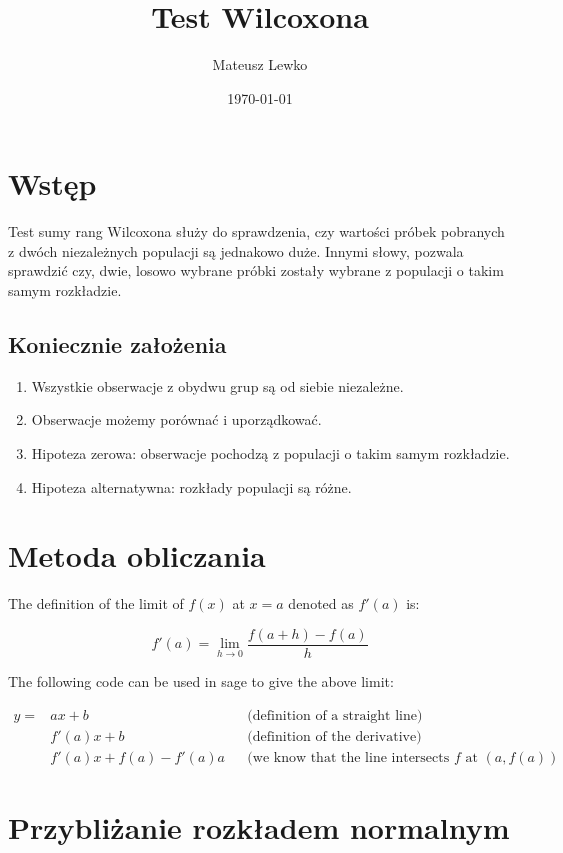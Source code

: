 \documentclass[a4paper]{article}
\title{Test Wilcoxona}
\author{Mateusz Lewko}
\date{\today}
\begin{document}
\maketitle

\section{Wstęp}

 Test sumy rang Wilcoxona służy do sprawdzenia, czy wartości próbek pobranych z dwóch niezależnych populacji są jednakowo duże. Innymi słowy, pozwala sprawdzić czy, dwie, losowo wybrane próbki zostały wybrane z populacji o takim samym rozkładzie. 

\subsection{Koniecznie założenia}
\begin{enumerate}
    \item Wszystkie obserwacje z obydwu grup są od siebie niezależne.
    \item Obserwacje możemy porównać i uporządkować.
    \item Hipoteza zerowa: obserwacje pochodzą z populacji o takim samym rozkładzie.
    \item Hipoteza alternatywna: rozkłady populacji są różne.
\end{enumerate}

\section{Metoda obliczania}

The definition of the limit of $f(x)$ at $x=a$ denoted as $f'(a)$ is:

\begin{equation}
f'(a) = \lim_{h\to0}\frac{f(a+h)-f(a)}{h}
\end{equation}

The following code can be used in sage to give the above limit:


\begin{align}
y=&ax+b&&\text{(definition of a straight line)}\nonumber\\
  &f'(a)x+b&&\text{(definition of the derivative)}\nonumber\\
  &f'(a)x+f(a)-f'(a)a&&\text{(we know that the line intersects $f$ at $(a,f(a))$}\nonumber
\end{align}

\section{Przybliżanie rozkładem normalnym}
\end{document}
